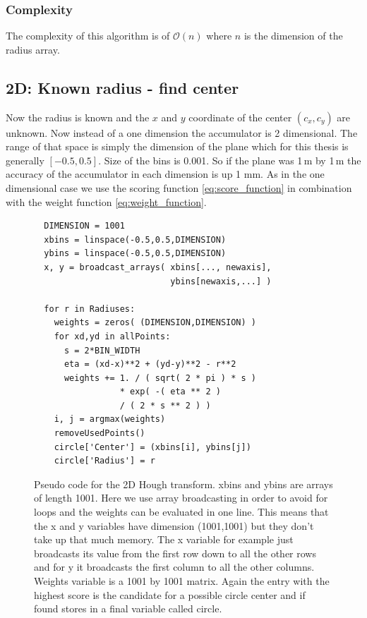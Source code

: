 \documentclass[11pt,twoside]{scrreprt}
\begin{document}
\subsubsection{Complexity} %
The complexity of this algorithm is of $\mathcal{O}(n)$ where $n$ is the dimension of the radius array.
\label{ssub:complexity_1d}


\subsection{2D: Known radius - find center} %
\label{sub:2d_known_radius_find_center}
Now the radius is known and the $x$ and $y$ coordinate of the center $(c_x, c_y)$ are unknown. Now instead of a one dimension the 
accumulator is 2 dimensional. The range of that space is simply the dimension of the plane which for this thesis is generally 
$[-0.5,0.5]$. Size of the bins is 0.001. So if the plane was 1\,m by 1\,m the accuracy of the accumulator in each dimension is 
up 1 mm. As in the one dimensional case we use the scoring function \ref{eq:score_function} in combination with the weight 
function \ref{eq:weight_function}.

\begin{figure}[b]
\begin{lstlisting}
  DIMENSION = 1001
  xbins = linspace(-0.5,0.5,DIMENSION)
  ybins = linspace(-0.5,0.5,DIMENSION)
  x, y = broadcast_arrays( xbins[..., newaxis], 
                           ybins[newaxis,...] )

  for r in Radiuses:
    weights = zeros( (DIMENSION,DIMENSION) )
    for xd,yd in allPoints:
      s = 2*BIN_WIDTH
      eta = (xd-x)**2 + (yd-y)**2 - r**2      
      weights += 1. / ( sqrt( 2 * pi ) * s ) 
                 * exp( -( eta ** 2 ) 
                 / ( 2 * s ** 2 ) )
    i, j = argmax(weights)
    removeUsedPoints()
    circle['Center'] = (xbins[i], ybins[j])
    circle['Radius'] = r
\end{lstlisting}
  \caption[Pseudo code 2D HT]{Pseudo code for the 2D Hough transform. xbins and ybins are arrays of length 1001. Here we use array broadcasting in order to avoid for loops and the weights can be evaluated in one line. This means that the x and y variables have dimension (1001,1001) but they don't take up that much memory. The x variable for example just broadcasts its value from the first row down to all the other rows and for y it broadcasts the first column to all the other columns. Weights variable is a 1001 by 1001 matrix. Again the entry with the highest score is the candidate for a possible circle center and if found stores in a final variable called circle.}
\end{figure}
\end{document}

